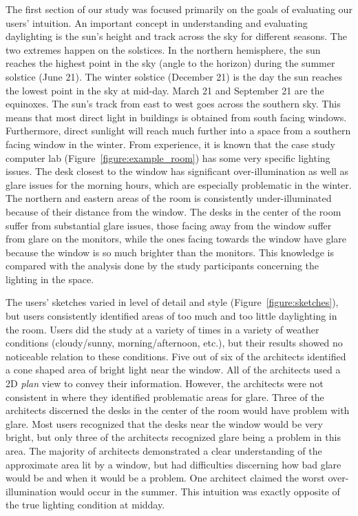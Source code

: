 \documentclass[preprint]{elsarticle}
\begin{document}
The first section of our study was focused primarily on the goals of
evaluating our users' intuition.
An important concept in understanding and evaluating daylighting is
the sun's height and track across the sky for different seasons.  The
two extremes happen on the solstices.  In the northern hemisphere, the
sun reaches the highest point in the sky (angle to the horizon) during
the summer solstice (June 21).  The winter solstice (December 21) is
the day the sun reaches the lowest point in the sky at mid-day.  March
21 and September 21 are the equinoxes.  The sun's track from east to
west goes across the southern sky.  This means that
most direct light in buildings is obtained from south facing windows.
Furthermore, direct sunlight will reach much further into a space from
a southern facing window in the winter.
%
From experience, it is known that the case study computer lab
(Figure~\ref{figure:example_room}) has some very specific lighting
issues.  The desk closest to the window has significant
over-illumination as well as glare issues for the morning hours, which
are especially problematic in the winter.  The northern and eastern
areas of the room is consistently under-illuminated because of their
distance from the window.  The desks in the center of the room suffer
from substantial glare issues, those facing away from the window
suffer from glare on the monitors, while the ones facing towards the
window have glare because the window is so much brighter than the
monitors.  This knowledge is compared with the analysis done by the
study participants concerning the lighting in the space.


The users' sketches varied in level of detail and style
(Figure~\ref{figure:sketches}), but users consistently identified
areas of too much and too little daylighting in the room.  Users did
the study at a variety of times in a variety of weather conditions
(cloudy/sunny, morning/afternoon, etc.), but their results showed no
noticeable relation to these conditions.  Five out of six of the
architects identified a cone shaped area of bright light near the
window.  All of the architects used a 2D {\em plan} view to convey
their information.  However, the architects were not consistent in
where they identified problematic areas for glare.  Three of the
architects discerned the desks in the center of the room would have
problem with glare.  Most users recognized that the desks near the
window would be very bright, but only three of the architects
recognized glare being a problem in this area.  The majority of architects 
demonstrated a clear understanding 
of the approximate area lit by a
window, but had difficulties discerning how bad glare would be and
when it would be a problem.  One architect claimed the worst
over-illumination would occur in the summer.  This intuition was
exactly opposite of the true lighting condition at midday.
\end{document}
